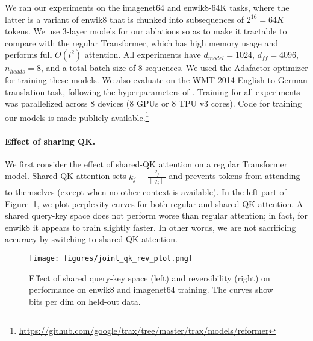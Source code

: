 We ran our experiments on the imagenet64 and enwik8-64K tasks, where the latter is a variant of enwik8 that is chunked into subsequences of $2^{16} = 64K$ tokens. We use 3-layer models for our ablations so as to make it tractable to compare with the regular Transformer, which has high memory usage and performs full $O(l^2)$ attention. All experiments have $d_{model}=1024$, $d_{ff}=4096$, $n_{heads}=8$, and a total batch size of 8 sequences. We used the Adafactor optimizer \citep{adafactor} for training these models. We also evaluate on the WMT 2014 English-to-German translation task, following the hyperparameters of \citet{transformer}. Training for all experiments was parallelized across 8 devices (8 GPUs or 8 TPU v3 cores). Code for training our models is made publicly available.\footnote{\url{https://github.com/google/trax/tree/master/trax/models/reformer}}

\paragraph{Effect of sharing QK.} \label{sec:exp_qk}
We first consider the effect of shared-QK attention on a regular Transformer model. Shared-QK attention sets $k_j = \frac{q_j}{\|q_j\|}$ and prevents tokens from attending to themselves (except when no other context is available). In the left part of Figure~\ref{fig:share-qk-rev}, we plot perplexity curves for both regular and shared-QK attention. A shared query-key space does not perform worse than regular attention; in fact, for enwik8 it appears to train slightly faster. In other words, we are not sacrificing accuracy by switching to shared-QK attention. 

\begin{figure}[t]
    \centering
    \texttt{[image: figures/joint\_qk\_rev\_plot.png]}
    \caption{Effect of shared query-key space (left) and reversibility (right) on 
    performance on enwik8 and imagenet64 training. The curves show bits per dim on held-out data.}
    \label{fig:share-qk-rev}
\end{figure}

